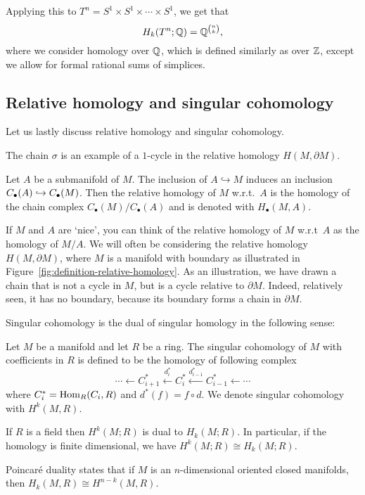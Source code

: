 \begin{eg}
    Applying this to $T^{n} = S^1 \times S^{1} \times \cdots\times S^{1}$, we get that
    \[
        H_k(T^n; \mathbb{Q}) = \mathbb{Q}^{\binom{n}{k}}
    ,\] 
    where we consider homology over $\mathbb{Q}$, which is defined similarly as over $\mathbb{Z}$, except we allow for formal rational sums of simplices.
\end{eg}

\subsection*{Relative homology and singular cohomology}

Let us lastly discuss relative homology and singular cohomology.


\begin{marginfigure}
    \centering
    \caption{The chain $\sigma$ is an example of a  $1$-cycle in the relative homology $H(M, \partial M)$.}
    \label{fig:definition-relative-homology}
\end{marginfigure}
\begin{definition}
    Let $A$ be a submanifold of $M$.
    The inclusion of $A \hookrightarrow M$ induces an inclusion  $C_{\bullet}(A) \hookrightarrow C_{\bullet}(M)$.
    Then the relative homology of $M$ w.r.t.\  $A$ is the homology of the chain complex  $C_\bullet(M) / C_\bullet(A)$ and is denoted with $H_{\bullet}(M, A)$.
\end{definition}

If $M$ and $A$ are `nice', you can think of the relative homology of $M$ w.r.t\  $A$ as the homology of  $M / A$.
We will often be considering the relative homology $H(M, \partial M)$, where $M$ is a manifold with boundary as illustrated in Figure~\ref{fig:definition-relative-homology}.
As an illustration, we have drawn a chain that is not a cycle in $M$, but is a cycle relative to $\partial M$. Indeed, relatively seen, it has no boundary, because its boundary forms a chain in $\partial M$.

\bigskip

Singular cohomology is the dual of singular homology in the following sense:
\begin{definition}
    Let $M$ be a manifold and let $R$ be a ring.
    The singular cohomology of $M$ with coefficients in $R$ is defined to be the homology of following complex
    \[
    \cdots \leftarrow C_{i+1}^{*} \xleftarrow{d_i^{*}}  
    C_{i}^{*} \xleftarrow{d_{i-1}^{*}}  
    C_{i-1}^{*} \leftarrow \cdots
    \] 
    where $C_{i}^{*} = \operatorname{Hom}_R(C_i, R)$ and $d^{*}(f) = f \circ  d$.
    We denote singular cohomology with $H^{k}(M, R)$.
\end{definition}
\begin{remark}
    If $R$ is a field then $H^{k}(M; R)$ is dual to $H_k(M; R)$.
    In particular, if the homology is finite dimensional, we have $H^{k}(M; R) \cong H_k(M; R)$.
\end{remark}
\begin{remark}
    Poincaré duality states that if $M$ is an  $n$-dimensional oriented closed manifolds, then $H_k(M, R) \cong H^{n-k}(M, R)$.
\end{remark}

